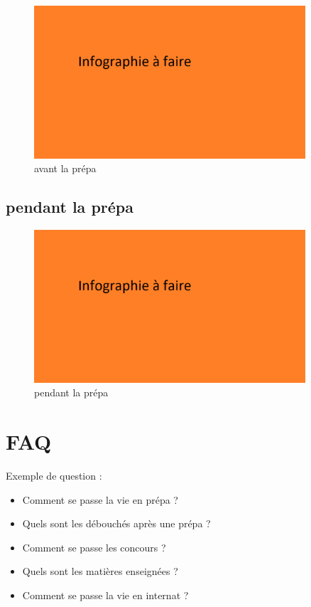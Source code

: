 \documentclass[aspectratio=169]{beamer}
\begin{document}
\begin{frame}
    \begin{figure}
        \centering
        \includegraphics[width=0.9\textwidth]{ressource_diapo/place older.png}
        \caption{avant la prépa}
    \end{figure}
\end{frame}

\subsection{pendant la prépa}

\begin{frame}
    \begin{figure}
        \centering
        \includegraphics[width=0.9\textwidth]{ressource_diapo/place older.png}
        \caption{pendant la prépa}
    \end{figure}
\end{frame}

\section{FAQ}

\begin{frame}
    Exemple de question :

    \begin{itemize}
        \item Comment se passe la vie en prépa ?
        \item Quels sont les débouchés après une prépa ?
        \item Comment se passe les concours ?
        \item Quels sont les matières enseignées ?
        \item Comment se passe la vie en internat ?
    \end{itemize}
\end{frame}
\end{document}
